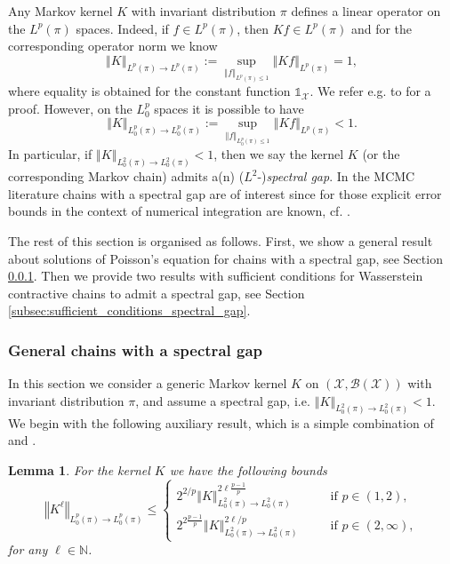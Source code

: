 \documentclass[12pt]{article}
\theoremstyle{plain}
\newtheorem{lem}[thm]{Lemma}
\newcommand{\norm}[1]{\left\Vert #1 \right\Vert}
\newcommand{\N}{\mathbb{N}}
\newcommand{\cX}{\mathcal{X}}
\begin{document}
{Any Markov kernel $K$ with invariant distribution $\pi$ defines a linear operator on the $L^p(\pi)$ spaces. 
Indeed, if $f \in L^p(\pi)$, then $Kf \in L^p(\pi)$ and for the corresponding operator norm we know
\[
\norm{K}_{L^p(\pi) \to L^p(\pi)} := \sup_{\norm{f}_{L^p(\pi) \leq 1}} \norm{K f}_{L^p(\pi)} = 1,
\]
where equality is obtained for the constant function $\mathds{1}_\cX$.
We refer e.g. to \cite{rudolf2012explicit} for a proof. 
However, on the $L^p_0$ spaces it is possible to have 
\[
\norm{K}_{L^p_0(\pi) \to L^p_0(\pi)} := \sup_{\norm{f}_{L^p_0(\pi) \leq 1}} \norm{K f}_{L^p(\pi)} < 1.
\]
In particular, if $\norm{K}_{L^2_0(\pi) \to L^2_0(\pi)}<1$, then we say the kernel $K$ (or the corresponding Markov chain) admits a(n) ($L^2$-)\textit{spectral gap}. 
In the MCMC literature chains with a spectral gap are of interest since for those explicit error bounds in the context of numerical integration are known, cf. \cite{rudolf2012explicit, hofstadler2025optimal}. 

The rest of this section is organised as follows. First, we show a general result about solutions of Poisson's equation for chains with a spectral gap, see Section \ref{subsec:general_results_spectral_gap}. Then we provide two results with sufficient conditions for Wasserstein contractive chains to admit a spectral gap, see Section \ref{subsec:sufficient_conditions_spectral_gap}. 

\subsubsection{General chains with a spectral gap}\label{subsec:general_results_spectral_gap}

In this section we consider a generic Markov kernel $K$ on $(\cX, \mathcal{B}(\cX))$ with invariant distribution $\pi$, and assume a spectral gap, i.e. $\norm{K}_{L^2_0(\pi) \to L^2_0(\pi)}< 1$.
We begin with the following auxiliary result, which is a simple combination of \cite[Lemma 3.16]{rudolf2012explicit} and \cite[Proposition 3.17]{rudolf2012explicit}. 

\begin{lem}\label{lem:spectral_gap_implies_L_p_bound}
For the kernel $K$ we have the following bounds
\[
\norm{K^\ell}_{L^p_0(\pi) \to L^p_0(\pi)} \leq 
\begin{cases}
	2^{2/p} \norm{K}_{L^2_0(\pi) \to L^2_0(\pi)}^{2\ell \frac{p-1}{p}} \qquad &\text{ if } p\in (1,2),\\[1.2ex]
	2^{2\frac{p-1}{p}} \norm{K}_{L^2_0(\pi) \to L^2_0(\pi)}^{2\ell/p} &\text{ if } p \in (2,\infty),
\end{cases}
\]
for any  $\ell \in \N$. 
\end{lem} 

}
\end{document}
